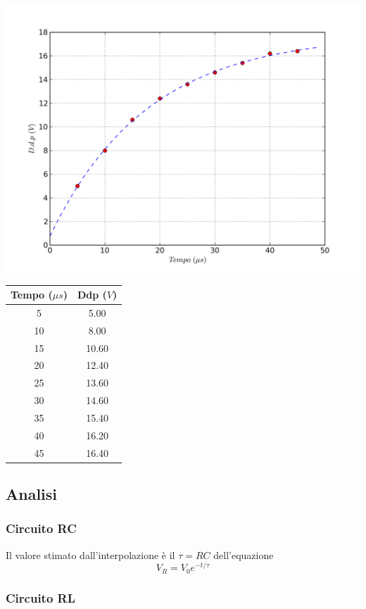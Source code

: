 \begin{center}
 \includegraphics[scale=0.70]{grafici/C3/fitindu.png}
\end{center}

\begin{center}
\begin{tabular}{*{2}{c}}
Tempo ($\mu s$) & Ddp ($V$) \\
\midrule
5 & 5.00 \\
10 & 8.00 \\
15 & 10.60 \\
20 & 12.40 \\
25 & 13.60 \\
30 & 14.60 \\
35 & 15.40 \\
40 & 16.20 \\
45 & 16.40 \\
\end{tabular}
\end{center}

\subsection{Analisi}

\subsubsection{Circuito RC}

Il valore stimato dall'interpolazione è il $\tau=RC$ dell'equazione
$$V_R = V_0 e^{-t/\tau}$$

\subsubsection{Circuito RL}

